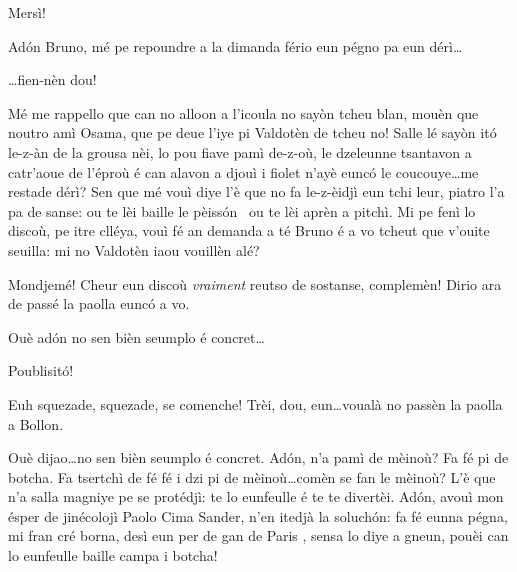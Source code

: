 \begin{drama}
\Presidanspeaks Mersì!


\Presidanspeaks Ad\'on Bruno, mé pe repoundre a la dimanda fério eun pégno pa eun dérì\ldots

\Brunospeaks \ldots fien-nèn dou!


\Presidanspeaks Mé me rappello que can no alloon a l’icoula no sayòn tcheu blan, mouèn que noutro amì Osama, que pe deue l'iye pi Valdotèn de tcheu no! Salle lé sayòn it\'o le-z-àn de la grousa nèi, lo pou fiave pamì de-z-où\ou , le dzeleunne tsantavon a catr'aoue de l'éproù é can alavon a djouì i fiolet n'ayè eunc\'o le coucouye\ldots me restade dérì? Sen que mé vouì diye l'è que no fa le-z-èidjì eun tchi leur, piatro l'a pa de sanse: ou te lèi baille le pèiss\'on \pesce\ ou te lèi aprèn a pitchì. Mi pe fenì lo discoù, pe itre clléya, vouì fé an demanda a té Bruno é a vo tcheut que v'ouite seuilla: mi no Valdotèn iaou vouillèn alé?


\Brunospeaks {} Mondjemé! Cheur eun discoù \textit{vraiment} reutso de sostanse,  complemèn!  Dirio ara de passé la paolla eunc\'o a vo.

\Jordyspeaks Ouè ad\'on no sen bièn seumplo é concret\ldots

\Brunospeaks Poublisit\'o!



\Brunospeaks {} Euh squezade, squezade, se comenche! Trèi, dou, eun\ldots voualà no passèn la paolla a Bollon.

\Jordyspeaks Ouè dijao\ldots no sen bièn seumplo é concret. Ad\'on, n'a pamì de mèinoù? Fa fé pi de botcha. Fa tsertchì de fé fé i dzi pi de mèinoù\ldots comèn se fan le mèinoù? L'è que n'a salla magniye pe se protédjì: te lo eunfeulle  é te te divertèi. Ad\'on, avouì mon ésper de jinécolojì Paolo Cima Sander, n'en itedjà la soluch\'on: fa fé eunna pégna, mi fran cré borna, desì eun per de gan de Paris \condom, sensa lo diye a gneun, pouèi can lo eunfeulle baille campa i botcha!


\end{drama}
